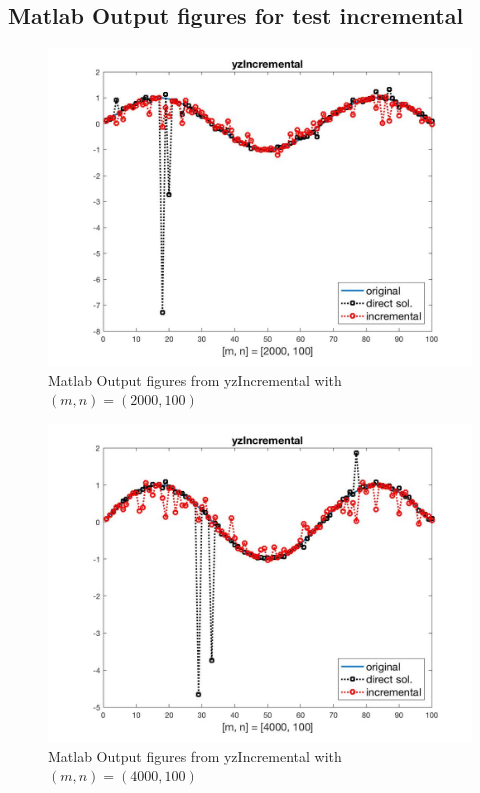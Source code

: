 \subsection*{Matlab Output figures for test incremental}
\begin{figure}[H]
\centering
\includegraphics[width=12cm]{f_1}
\caption{Matlab Output figures from yzIncremental with$(m,n)=(2000,100)$}
\end{figure}
\begin{figure}[H]
\centering
\includegraphics[width=12cm]{f_2}
\caption{Matlab Output figures from yzIncremental with$(m,n)=(4000,100)$}
\end{figure}
